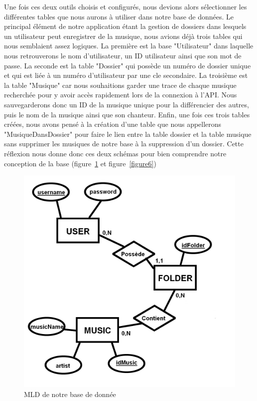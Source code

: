 \documentclass[12pt,french]{article}
\begin{document}
Une fois ces deux outils choisis et configurés, nous devions alors sélectionner les différentes \gls{table}s que nous aurons à utiliser dans notre base de données. Le principal élément de notre application étant la gestion de dossiers dans lesquels un utilisateur peut enregistrer de la musique, nous avions déjà trois \gls{table}s qui nous semblaient assez logiques. La première est la base "Utilisateur" dans laquelle nous retrouverons le nom d'utilisateur, un ID utilisateur ainsi que son mot de passe. La seconde est la \gls{table} "Dossier" qui possède un numéro de dossier unique et qui est liée à un numéro d'utilisateur par une \gls{cle} secondaire. La troisième est la \gls{table} "Musique" car nous souhaitions garder une trace de chaque musique recherchée pour y avoir accès rapidement lors de la connexion à l'\gls{API}. Nous sauvegarderons donc un ID de la musique unique pour la différencier des autres, puis le nom de la musique ainsi que son chanteur. Enfin, une fois ces trois \gls{table}s créées, nous avons pensé à la création d'une \gls{table} que nous appellerons "MusiqueDansDossier" pour faire le lien entre la \gls{table} dossier et la \gls{table} musique sans supprimer les musiques de notre base à la suppression d'un dossier. Cette réflexion nous donne donc ces deux schémas pour bien comprendre notre conception de la base (figure~\ref{figure5} et figure~\ref{figure6})

\begin{figure}[H]
	\centering
	\includegraphics[scale=0.3]{diag_database.png}
	\caption{MLD de notre base de donnée} 
	\label{figure5}    
\end{figure}
\end{document}
